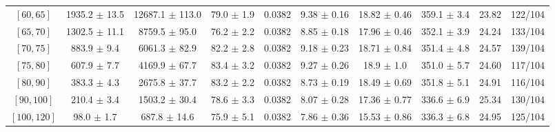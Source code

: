 \begin{tabular}{c||c|c|c|c|c|c|c||c|c}
$[60, 65]$ & 1935.2 $\pm$ 13.5 & 12687.1 $\pm$ 113.0 & 79.0 $\pm$ 1.9 & 0.0382 & 9.38 $\pm$ 0.16 & 18.82 $\pm$ 0.46 & 359.1 $\pm$ 3.4 & 23.82 & 122/104\\
$[65, 70]$ & 1302.5 $\pm$ 11.1 & 8759.5 $\pm$ 95.0 & 76.2 $\pm$ 2.2 & 0.0382 & 8.85 $\pm$ 0.18 & 17.96 $\pm$ 0.46 & 352.1 $\pm$ 3.9 & 24.24 & 133/104\\
$[70, 75]$ & 883.9 $\pm$ 9.4 & 6061.3 $\pm$ 82.9 & 82.2 $\pm$ 2.8 & 0.0382 & 9.18 $\pm$ 0.23 & 18.71 $\pm$ 0.84 & 351.4 $\pm$ 4.8 & 24.57 & 139/104\\
$[75, 80]$ & 607.9 $\pm$ 7.7 & 4169.9 $\pm$ 67.7 & 83.4 $\pm$ 3.2 & 0.0382 & 9.27 $\pm$ 0.26 & 18.9 $\pm$ 1.0 & 351.0 $\pm$ 5.7 & 24.60 & 117/104\\
$[80, 90]$ & 383.3 $\pm$ 4.3 & 2675.8 $\pm$ 37.7 & 83.2 $\pm$ 2.2 & 0.0382 & 8.73 $\pm$ 0.19 & 18.49 $\pm$ 0.69 & 351.8 $\pm$ 5.1 & 24.91 & 116/104\\
$[90, 100]$ & 210.4 $\pm$ 3.4 & 1503.2 $\pm$ 30.4 & 78.6 $\pm$ 3.3 & 0.0382 & 8.07 $\pm$ 0.28 & 17.36 $\pm$ 0.77 & 336.6 $\pm$ 6.9 & 25.34 & 130/104\\
$[100, 120]$ & 98.0 $\pm$ 1.7 & 687.8 $\pm$ 14.6 & 75.9 $\pm$ 5.1 & 0.0382 & 7.86 $\pm$ 0.36 & 15.53 $\pm$ 0.86 & 336.3 $\pm$ 6.8 & 24.95 & 125/104\\
\end{tabular}

